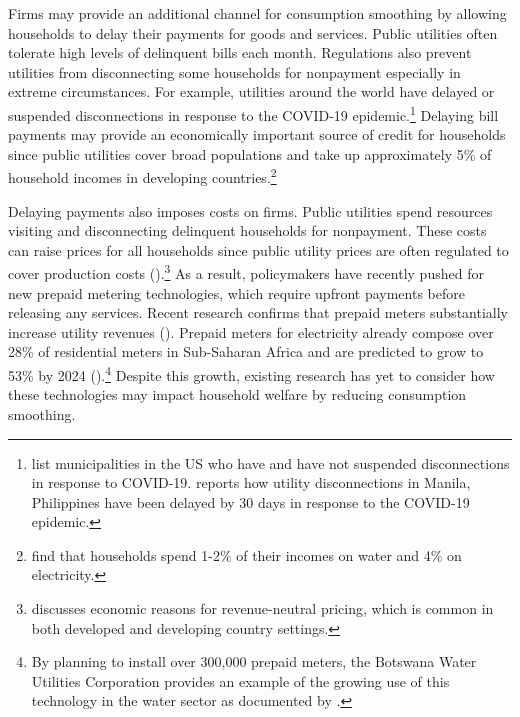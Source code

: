 \documentclass[12pt,table]{article}
\begin{document}
Firms may provide an additional channel for consumption smoothing by allowing households to delay their payments for goods and services.  Public utilities often tolerate high levels of delinquent bills each month.  Regulations also prevent utilities from disconnecting some households for nonpayment especially in extreme circumstances.  For example, utilities around the world have delayed or suspended disconnections in response to the COVID-19 epidemic.\footnote{\cite{bufordcampbell2020} list municipalities in the US who have and have not suspended disconnections in response to COVID-19.  \cite{domingo2020} reports how utility disconnections in Manila, Philippines have been delayed by 30 days in response to the COVID-19 epidemic.}   Delaying bill payments may provide an economically important source of credit for households since public utilities cover broad populations and take up approximately 5\% of household incomes in developing countries.\footnote{\cite{komives2006distributional} find that households spend 1-2\% of their incomes on water and 4\% on electricity.}

Delaying payments also imposes costs on firms.  Public utilities spend resources visiting and disconnecting delinquent households for nonpayment.  These costs can raise prices for all households since public utility prices are often regulated to cover production costs (\cite{hoque2013state}).\footnote{\cite{laffont2005regulation} discusses economic reasons for revenue-neutral pricing, which is common in both developed and developing country settings.}  As a result, policymakers have recently pushed for new prepaid metering technologies, which require upfront payments before releasing any services.  Recent research confirms that prepaid meters substantially increase utility revenues (\cite{jack2016charging}).  Prepaid meters for electricity already compose over 28\% of residential meters in Sub-Saharan Africa and are predicted to grow to 53\% by 2024 (\cite{northeast2014}).\footnote{By planning to install over 300,000 prepaid meters, the Botswana Water Utilities Corporation provides an example of the growing use of this technology in the water sector as documented by \cite{heymans2014limits}.}  Despite this growth, existing research has yet to consider how these technologies may impact household welfare by reducing consumption smoothing.

\end{document}
